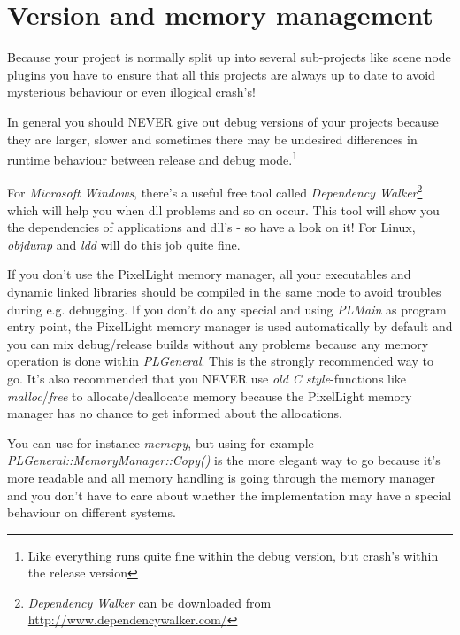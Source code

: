 \section{Version and memory management}
Because your project is normally split up into several sub-projects like scene node plugins you have to ensure that all this projects are always up to date to avoid mysterious behaviour or even illogical crash's!

In general you should NEVER give out debug versions of your projects because they are larger, slower and sometimes there may be undesired differences in runtime behaviour between release and debug mode.\footnote{Like everything runs quite fine within the debug version, but crash's within the release version}

For \emph{Microsoft Windows}, there's a useful free tool called \emph{Dependency Walker}\footnote{\emph{Dependency Walker} can be downloaded from \url{http://www.dependencywalker.com/}} which will help you when dll problems and so on occur. This tool will show you the dependencies of applications and dll's - so have a look on it! For Linux, \emph{objdump} and \emph{ldd} will do this job quite fine.

If you don't use the PixelLight memory manager, all your executables and dynamic linked libraries should be compiled in the same mode to avoid troubles during e.g. debugging. If you don't do any special and using \emph{PLMain} as program entry point, the PixelLight memory manager is used automatically by default and you can mix debug/release builds without any problems because any memory operation is done within \emph{PLGeneral}. This is the strongly recommended way to go. It's also recommended that you NEVER use \emph{old C style}-functions like \emph{malloc}/\emph{free} to allocate/deallocate memory because the PixelLight memory manager has no chance to get informed about the allocations.

You can use for instance \emph{memcpy}, but using for example \emph{PLGeneral::MemoryManager::Copy()} is the more elegant way to go because it's more readable and all memory handling is going through the memory manager and you don't have to care about whether the implementation may have a special behaviour on different systems.
